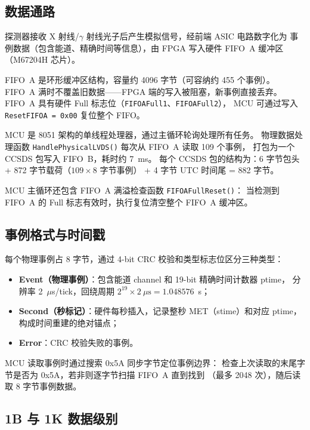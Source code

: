 \documentclass[aps,prd,twocolumn,nofootinbib,superscriptaddress]{revtex4-2}
\begin{document}
\subsection{数据通路}

探测器接收 X 射线/$\gamma$ 射线光子后产生模拟信号，经前端 ASIC 电路数字化为
事例数据（包含能道、精确时间等信息），由 FPGA 写入硬件 FIFO~A 缓冲区（M67204H 芯片）。

FIFO~A 是环形缓冲区结构，容量约 4096 字节（可容纳约 455 个事例）。
FIFO~A 满时不覆盖旧数据——FPGA 端的写入被阻塞，新事例直接丢弃。
FIFO~A 具有硬件 Full 标志位（\texttt{FIFOAFull1}、\texttt{FIFOAFull2}），
MCU 可通过写入 \texttt{ResetFIFOA = 0x00} 复位整个 FIFO。

MCU 是 8051 架构的单线程处理器，通过主循环轮询处理所有任务。
物理数据处理函数 \texttt{HandlePhysicalLVDS()} 每次从 FIFO~A 读取 109 个事例，
打包为一个 CCSDS 包写入 FIFO~B，耗时约 7~ms。
每个 CCSDS 包的结构为：6 字节包头 + 872 字节载荷（$109 \times 8$ 字节事例）
+ 4 字节 UTC 时间尾 = 882 字节。

MCU 主循环还包含 FIFO~A 满溢检查函数 \texttt{FIFOAFullReset()}：
当检测到 FIFO~A 的 Full 标志有效时，执行复位清空整个 FIFO~A 缓冲区。

\subsection{事例格式与时间戳}

每个物理事例占 8 字节，通过 4-bit CRC 校验和类型标志位区分三种类型：

\begin{itemize}
  \item \textbf{Event（物理事例）}：包含能道 channel 和 19-bit 精确时间计数器 ptime，
    分辨率 2~$\mu$s/tick，回绕周期 $2^{19} \times 2~\mu\text{s} = 1.048576$~s；
  \item \textbf{Second（秒标记）}：硬件每秒插入，记录整秒 MET（stime）和对应 ptime，
    构成时间重建的绝对锚点；
  \item \textbf{Error}：CRC 校验失败的事例。
\end{itemize}

MCU 读取事例时通过搜索 0x5A 同步字节定位事例边界：
检查上次读取的末尾字节是否为 0x5A，若非则逐字节扫描 FIFO~A 直到找到
（最多 2048 次），随后读取 8 字节事例数据。

\subsection{1B 与 1K 数据级别}
\end{document}
